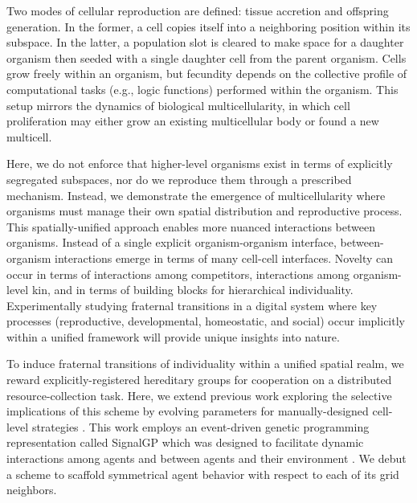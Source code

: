 Two modes of cellular reproduction are defined: tissue accretion and offspring generation.
In the former, a cell copies itself into a neighboring position within its subspace.
In the latter, a population slot is cleared to make space for a daughter organism then seeded with a single daughter cell from the parent organism.
Cells grow freely within an organism, but fecundity depends on the collective profile of computational tasks (e.g., logic functions) performed within the organism.
This setup mirrors the dynamics of biological multicellularity, in which cell proliferation may either grow an existing multicellular body or found a new multicell.

Here, we do not enforce that higher-level organisms exist in terms of explicitly segregated subspaces, nor do we reproduce them through a prescribed mechanism.
Instead, we demonstrate the emergence of multicellularity where organisms must manage their own spatial distribution and reproductive process.
This spatially-unified approach enables more nuanced interactions between organisms.
Instead of a single explicit organism-organism interface, between-organism interactions emerge in terms of many cell-cell interfaces.
Novelty can occur in terms of interactions among competitors, interactions among organism-level kin, and in terms of building blocks for hierarchical individuality.
Experimentally studying fraternal transitions in a digital system where key processes (reproductive, developmental, homeostatic, and social) occur implicitly within a unified framework will provide unique insights into nature.

To induce fraternal transitions of individuality within a unified spatial realm, we reward explicitly-registered hereditary groups for cooperation on a distributed resource-collection task.
Here, we extend previous work exploring the selective implications of this scheme by evolving parameters for manually-designed cell-level strategies \citep{moreno2019toward}.
This work employs an event-driven genetic programming representation called  SignalGP which was designed to facilitate dynamic interactions among agents and between agents and their environment \citep{lalejini2018evolving}.
We debut a scheme to scaffold symmetrical agent behavior with respect to each of its grid neighbors.
